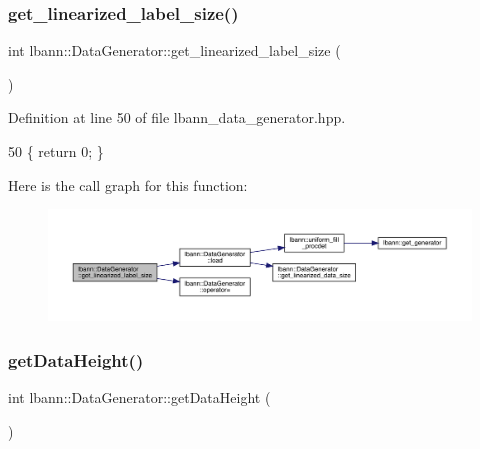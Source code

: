 \subsubsection{\texorpdfstring{get\+\_\+linearized\+\_\+label\+\_\+size()}{get\_linearized\_label\_size()}}
{\footnotesize\ttfamily int lbann\+::\+Data\+Generator\+::get\+\_\+linearized\+\_\+label\+\_\+size (\begin{DoxyParamCaption}{ }\end{DoxyParamCaption})\hspace{0.3cm}{\ttfamily [inline]}}



Definition at line 50 of file lbann\+\_\+data\+\_\+generator.\+hpp.


\begin{DoxyCode}
50 \{ \textcolor{keywordflow}{return} 0; \}
\end{DoxyCode}
Here is the call graph for this function\+:\nopagebreak
\begin{figure}[H]
\begin{center}
\leavevmode
\includegraphics[width=350pt]{classlbann_1_1DataGenerator_a47c97d76cf83d53ef298f5ad5115e6cc_cgraph}
\end{center}
\end{figure}
\mbox{\label{classlbann_1_1DataGenerator_ac85f1beaddb41e8d198e2986b7e2365e}} 
\subsubsection{\texorpdfstring{get\+Data\+Height()}{getDataHeight()}}
{\footnotesize\ttfamily int lbann\+::\+Data\+Generator\+::get\+Data\+Height (\begin{DoxyParamCaption}{ }\end{DoxyParamCaption})\hspace{0.3cm}{\ttfamily [inline]}}



